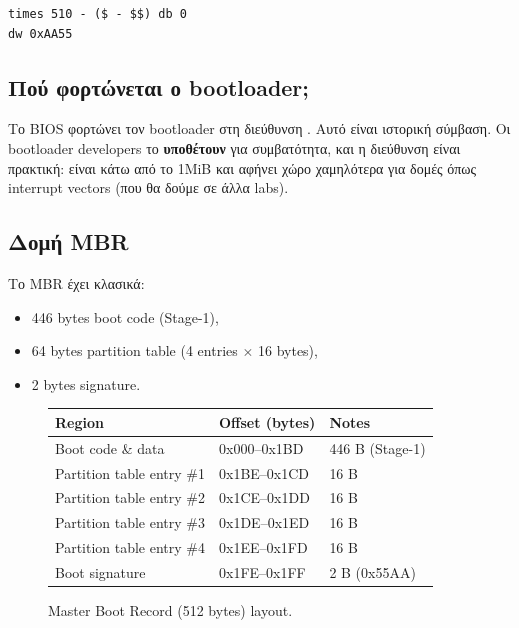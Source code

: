 \documentclass[18pt]{extarticle}
\begin{document}
\begin{file}
\footnotesize \begin{lstlisting}[language={[x86masm]Assembler}, tabsize=2]
times 510 - ($ - $$) db 0
dw 0xAA55
\end{lstlisting}
\end{file}

\subsection{Πού φορτώνεται ο bootloader;}

Το BIOS φορτώνει τον bootloader στη διεύθυνση . Αυτό είναι ιστορική σύμβαση.
Οι bootloader developers το \textbf{υποθέτουν} για συμβατότητα, και η διεύθυνση είναι πρακτική:
είναι κάτω από το 1MiB και αφήνει χώρο χαμηλότερα για δομές όπως interrupt vectors (που θα δούμε σε άλλα labs).

\subsection{Δομή MBR}

Το MBR έχει κλασικά:
\begin{itemize}
    \item 446 bytes boot code (Stage-1),
    \item 64 bytes partition table (4 entries $\times$ 16 bytes),
    \item 2 bytes signature.
\end{itemize}

\begin{figure}[H]
    \centering
    \begin{tabular}{|l|l|l|}
        \hline
        \textbf{Region} & \textbf{Offset (bytes)} & \textbf{Notes} \\
        \hline
        Boot code \& data & 0x000--0x1BD & 446 B (Stage-1) \\
        \hline
        Partition table entry \#1 & 0x1BE--0x1CD & 16 B \\
        \hline
        Partition table entry \#2 & 0x1CE--0x1DD & 16 B \\
        \hline
        Partition table entry \#3 & 0x1DE--0x1ED & 16 B \\
        \hline
        Partition table entry \#4 & 0x1EE--0x1FD & 16 B \\
        \hline
        Boot signature & 0x1FE--0x1FF & 2 B (0x55AA) \\
        \hline
    \end{tabular}
    \caption{Master Boot Record (512 bytes) layout.}
    \label{fig:mbr_layout}
\end{figure}
\end{document}
